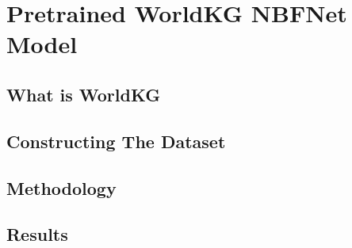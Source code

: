 \chapter{Pretrained WorldKG NBFNet Model}\label{ch:worldkg}


\section{What is WorldKG}\label{sec:what-is-worldkg}


\section{Constructing The Dataset}\label{sec:constructing-dataset}


\section{Methodology}\label{sec:worldkg-methodology}


\section{Results}\label{sec:worldkg-results}
